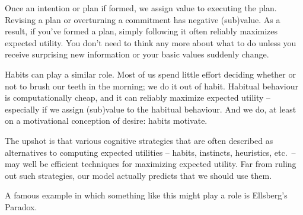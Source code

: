 Once an intention or plan if formed, we assign value to executing the
plan. Revising a plan or overturning a commitment has negative
(sub)value. As a result, if you've formed a plan, simply following it
often reliably maximizes expected utility. You don't need to think any
more about what to do unless you receive surprising new information or
your basic values suddenly change.

Habits can play a similar role. Most of us spend little effort
deciding whether or not to brush our teeth in the morning; we do it
out of habit. Habitual behaviour is computationally cheap, and it can
reliably maximize expected utility -- especially if we assign
(sub)value to the habitual behaviour. And we do, at least on a
motivational conception of desire: habits motivate.

The upshot is that various cognitive strategies that are often
described as alternatives to computing expected utilities -- habits,
instincts, heuristics, etc.\ -- may well be efficient
techniques for maximizing expected utility. Far from ruling out such
strategies, our model actually predicts that we should use them.


A famous example in which something like this might play a role is
Ellsberg's Paradox.

